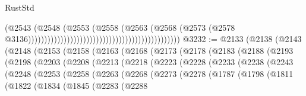 \begin{lexlean}{RustStd}
\begin{coremodule}
                                                                                  (@2543
                                                                                    (@2548
                                                                                      (@2553
                                                                                        (@2558
                                                                                          (@2563
                                                                                            (@2568
                                                                                              (@2573
                                                                                                (@2578
                                                                                                  @3136)))))))))))))))))))))))))))))))))))))))))))))))
@3232 := @2133
    (@2138
      (@2143
        (@2148
          (@2153
            (@2158
              (@2163
                (@2168
                  (@2173
                    (@2178
                      (@2183
                        (@2188
                          (@2193
                            (@2198
                              (@2203
                                (@2208
                                  (@2213
                                    (@2218
                                      (@2223
                                        (@2228
                                          (@2233
                                            (@2238
                                              (@2243
                                                (@2248
                                                  (@2253
                                                    (@2258
                                                      (@2263
                                                        (@2268
                                                          (@2273
                                                            (@2278
                                                              (@1787
                                                                (@1798
                                                                  (@1811
                                                                    (@1822
                                                                      (@1834
                                                                        (@1845
                                                                          (@2283
                                                                            (@2288

\end{coremodule}
\end{lexlean}
